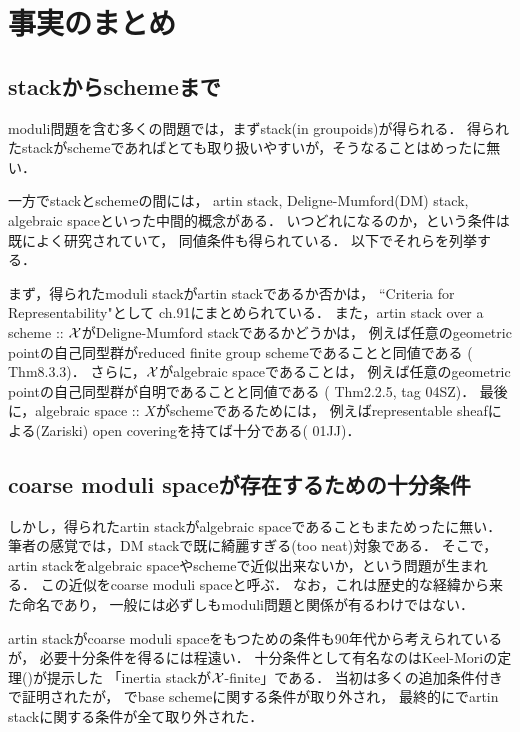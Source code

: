 \documentclass[a4paper, dvipdfmx]{jsarticle}
\begin{document}
\section{事実のまとめ}
    \subsection{stackからschemeまで}
    moduli問題を含む多くの問題では，まずstack(in groupoids)が得られる．
    得られたstackがschemeであればとても取り扱いやすいが，そうなることはめったに無い．
    
    一方でstackとschemeの間には，
    artin stack, Deligne-Mumford(DM) stack, algebraic spaceといった中間的概念がある．
    いつどれになるのか，という条件は既によく研究されていて，
    同値条件も得られている．
    以下でそれらを列挙する．

    まず，得られたmoduli stackがartin stackであるか否かは，
    ``Criteria for Representability"として\cite{SP} ch.91にまとめられている．
    また，artin stack over a scheme :: $\mathcal{X}$がDeligne-Mumford stackであるかどうかは，
    例えば任意のgeometric pointの自己同型群がreduced finite group schemeであることと同値である
    (\cite{ASS} Thm8.3.3)．
    さらに，$\mathcal{X}$がalgebraic spaceであることは，
    例えば任意のgeometric pointの自己同型群が自明であることと同値である
    (\cite{Con07} Thm2.2.5, \cite{SP} tag 04SZ)．
    最後に，algebraic space :: $X$がschemeであるためには，
    例えばrepresentable sheafによる(Zariski) open coveringを持てば十分である(\cite{SP} 01JJ)．

    \subsection{coarse moduli spaceが存在するための十分条件}
    しかし，得られたartin stackがalgebraic spaceであることもまためったに無い．
    筆者の感覚では，DM stackで既に綺麗すぎる(too neat)対象である．
    そこで，artin stackをalgebraic spaceやschemeで近似出来ないか，という問題が生まれる．
    この近似をcoarse moduli spaceと呼ぶ．
    なお，これは歴史的な経緯から来た命名であり，
    一般には必ずしもmoduli問題と関係が有るわけではない．

    artin stackがcoarse moduli spaceをもつための条件も90年代から考えられているが，
    必要十分条件を得るには程遠い．
    十分条件として有名なのはKeel-Moriの定理(\cite{KM97})が提示した
    「inertia stackが$\mathcal{X}$-finite」である．
    当初は多くの追加条件付きで証明されたが，
    \cite{Con05}でbase schemeに関する条件が取り外され，
    最終的に\cite{Rydh13}でartin stackに関する条件が全て取り外された．
    
\end{document}
